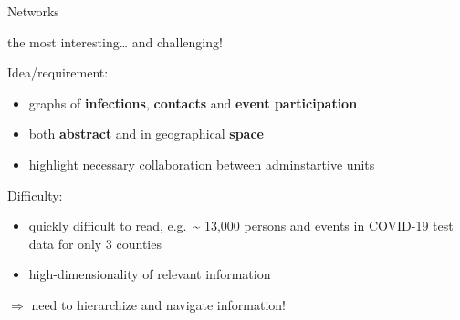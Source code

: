 \documentclass[
  8pt,
  ignorenonframetext,
]{beamer}
\providecommand{\tightlist}{%
  \setlength{\itemsep}{0pt}\setlength{\parskip}{0pt}}
\begin{document}
\begin{frame}
\begin{block}{Networks}
\protect\hypertarget{networks}{}
\vspace{0.5cm}

the most interesting\ldots{} and challenging!

\vspace{0.5cm}

Idea/requirement:

\begin{itemize}
\tightlist
\item
  graphs of \textbf{infections}, \textbf{contacts} and \textbf{event
  participation}
\item
  both \textbf{abstract} and in geographical \textbf{space}
\item
  highlight necessary collaboration between adminstartive units
\end{itemize}

\vspace{0.5cm}

Difficulty:

\begin{itemize}
\tightlist
\item
  quickly difficult to read, e.g.~\textasciitilde{} 13,000 persons and
  events in COVID-19 test data for only 3 counties
\item
  high-dimensionality of relevant information
\end{itemize}

\vspace{0.5cm}

\(\Longrightarrow\) need to hierarchize and navigate information!
\end{block}
\end{frame}
\end{document}
